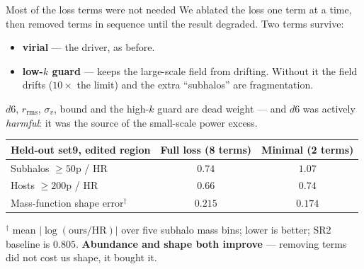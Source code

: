 \documentclass[aspectratio=169]{beamer}
\begin{document}


\begin{frame}{Most of the loss terms were not needed}
\small
We ablated the loss one term at a time, then removed terms in sequence until the
result degraded. Two terms survive:
\vspace{0.1cm}
\begin{itemize}
    \item \textbf{virial} --- the driver, as before.
    \item \textbf{low-$k$ guard} --- keeps the large-scale field from drifting.
          Without it the field drifts ($10\times$ the limit) and the extra
          ``subhalos'' are fragmentation.
\end{itemize}
\vspace{0.1cm}
{\footnotesize $d6$, $r_{\mathrm{rms}}$, $\sigma_v$, bound and the high-$k$ guard
are dead weight --- and $d6$ was actively \emph{harmful}: it was the source of
the small-scale power excess.}

\vspace{0.25cm}
\centering
\begin{tabular}{l c c}
\hline
Held-out set9, edited region & Full loss (8 terms) & \textbf{Minimal (2 terms)} \\
\hline
Subhalos $\ge50$p / HR   & $0.74$  & $\mathbf{1.07}$ \\
Hosts $\ge200$p / HR     & $0.66$  & $\mathbf{0.74}$ \\
Mass-function shape error$^\dagger$ & $0.215$ & $\mathbf{0.174}$ \\
\hline
\end{tabular}

\vspace{0.2cm}
{\scriptsize $^\dagger$ mean $|\log(\mathrm{ours}/\mathrm{HR})|$ over five subhalo
mass bins; lower is better; SR2 baseline is $0.805$.
\textbf{Abundance and shape both improve} --- removing terms did not cost us
shape, it bought it.}
\end{frame}

\end{document}
